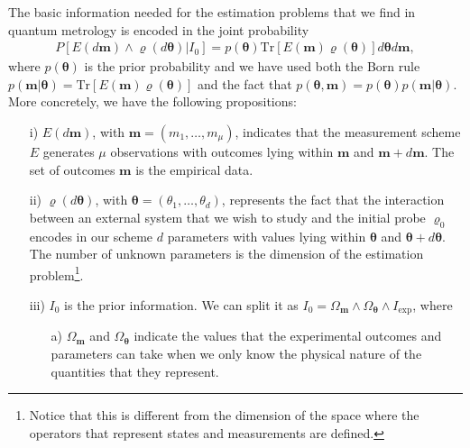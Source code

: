 The basic information needed for the estimation problems that we find in quantum metrology is encoded in the joint probability
\begin{eqnarray}
P\left[E(d\boldsymbol{m}) \land \varrho(d\boldsymbol{\theta}) | I_0\right] = p(\boldsymbol{\theta})\mathrm{Tr}\left[E(\boldsymbol{m})\varrho(\boldsymbol{\theta}) \right] d\boldsymbol{\theta} d\boldsymbol{m},
\label{basicinfo}
\end{eqnarray}
where $p(\boldsymbol{\theta})$ is the prior probability and we have used both the Born rule $p(\boldsymbol{m}|\boldsymbol{\theta}) = \mathrm{Tr}\left[E(\boldsymbol{m})\varrho(\boldsymbol{\theta})\right]$ and the fact that $p(\boldsymbol{\theta}, \boldsymbol{m}) = p(\boldsymbol{\theta}) p(\boldsymbol{m}|\boldsymbol{\theta})$. More concretely, we have the following propositions:
\begin{itemize}
\item[i)] $E(d\boldsymbol{m})$, with $\boldsymbol{m} = (m_1, \dots, m_\mu)$, indicates that the measurement scheme $E$ generates $\mu$ observations with outcomes lying within $\boldsymbol{m}$ and $\boldsymbol{m} + d\boldsymbol{m}$. The set of outcomes $\boldsymbol{m}$ is the empirical data. 
\item [ii)] $\varrho(d\boldsymbol{\theta})$, with $\boldsymbol{\theta} = (\theta_1, \dots, \theta_d)$, represents the fact that the interaction between an external system that we wish to study and the initial probe $\varrho_0$ encodes in our scheme $d$ parameters with values lying within $\boldsymbol{\theta}$ and $\boldsymbol{\theta} + d\boldsymbol{\theta}$. The number of unknown parameters is the dimension of the estimation problem\footnote{Notice that this is different from the dimension of the space where the operators that represent states and measurements are defined.}. 
\item [iii)] $I_0$ is the prior information. We can split it as $I_0 = \Omega_{\boldsymbol{m}} \land \Omega_{\boldsymbol{\theta}} \land I_{\mathrm{exp}}$, where
\begin{itemize}
\item[a)] $\Omega_{\boldsymbol{m}}$ and $\Omega_{\boldsymbol{\theta}}$ indicate the values that the experimental outcomes and parameters can take when we only know the physical nature of the quantities that they represent.

\end{itemize}
\end{itemize}

